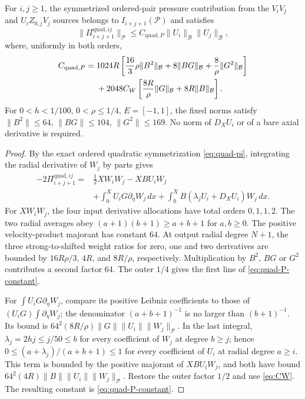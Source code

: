 \begin{theorem}
\label{thm:quadratic-bare-P}
For $i,j\ge1$, the symmetrized ordered-pair pressure contribution
from the $V_iV_j$ and $U_iZ_{0,j}V_j$ sources belongs to
$I_{i+j+1}(\mathcal P)$ and satisfies
\[
 \|\Pi_{i+j+1}^{\mathrm{quad},ij}\|_{\mathcal P}
 \le C_{\mathrm{quad},P}\|U_i\|_{\mathcal B}\|U_j\|_{\mathcal B},
\]
where, uniformly in both orders,
\begin{align}\label{eq:quad-P-constant}
 C_{\mathrm{quad},P}={}&1024R
 \left[\frac{16}{3}\rho\|B^2\|_{\mathcal B}
 +8\|BG\|_{\mathcal B}+\frac8\rho\|G^2\|_{\mathcal B}\right]\notag\\
 &+2048C_W\left[\frac{8R}{\rho}\|G\|_{\mathcal B}
                        +8R\|B\|_{\mathcal B}\right].
\end{align}
For $0<h<1/100$, $0<\rho\le1/4$, $E=[-1,1]$, the fixed norms
satisfy $\|B^2\|\le64$, $\|BG\|\le104$, $\|G^2\|\le169$.
No norm of $D_XU_i$ or of a bare axial derivative is required.
\end{theorem}
\begin{proof}
By the exact ordered quadratic symmetrization
\eqref{eq:quad-pi}, integrating the radial derivative of $W_j$
by parts gives
\begin{equation}\label{eq:quad-P-IBP}
 \begin{split}
 -2\Pi_{i+j+1}^{\mathrm{quad},ij}
 ={}&\frac12XW_iW_j-XBU_iW_j\\
 &+\int_0^X U_iG\partial_\eta W_j\,dx
 +\int_0^X B(\lambda_jU_i+D_XU_i)W_j\,dx .
 \end{split}
\end{equation}
For $XW_iW_j$, the four input derivative allocations have
total orders $0,1,1,2$. The two radial averages obey
$(a+1)(b+1)\ge a+b+1$ for $a,b\ge0$.
The positive velocity-product majorant has constant $64$.
At output radial degree $N+1$, the three strong-to-shifted
weight ratios for zero, one and two derivatives are bounded by
$16R\rho/3$, $4R$, and $8R/\rho$, respectively.
Multiplication by $B^2$, $BG$ or $G^2$ contributes a second
factor $64$. The outer $1/4$ gives the first line of
\eqref{eq:quad-P-constant}.

For $\int U_iG\partial_\eta W_j$, compare its positive
Leibniz coefficients to those of
$(U_iG)\int\partial_\eta W_j$;
the denominator $(a+b+1)^{-1}$ is no larger than
$(b+1)^{-1}$. Its bound is
$64^2(8R/\rho)\|G\|\|U_i\|\|W_j\|_{\mathcal P}$.
In the last integral, $\lambda_j=2hj\le j/50\le b$
for every coefficient of $W_j$ at degree $b\ge j$; hence
$0\le(a+\lambda_j)/(a+b+1)\le1$ for every coefficient
of $U_i$ at radial degree $a\ge i$.
This term is bounded by the positive majorant of $XBU_iW_j$,
and both have bound $64^2(4R)\|B\|\|U_i\|\|W_j\|_{\mathcal P}$.
Restore the outer factor $1/2$ and use \eqref{eq:CW}.
The resulting constant is \eqref{eq:quad-P-constant}.
\end{proof}

